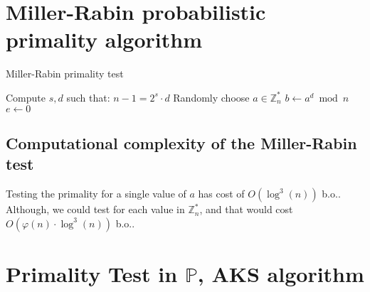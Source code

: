 \section{Miller-Rabin probabilistic primality algorithm}
\begin{algorithm}
\caption{Miller-Rabin primality test}\label{alg:miller_rabin_ptest}
Compute $s, d$ such that: $n - 1 = 2^{s} \cdot d$\;
Randomly choose $a \in \mathbb{Z}_{n}^{*}$\;
$b \gets a^{d} \bmod n$\;
$e \gets 0$\;
\;
\end{algorithm}
\subsection{Computational complexity of the Miller-Rabin test}
Testing the primality for a single value of $a$ has cost of $O(\operatorname{log}^{3}(n))$ b.o.. Although, we could test for each value in $\mathbb{Z}_{n}^{*}$, and that would cost $O(\varphi(n) \cdot \operatorname{log}^{3}(n))$ b.o..

\section{Primality Test in $\mathbb{P}$, AKS algorithm}
